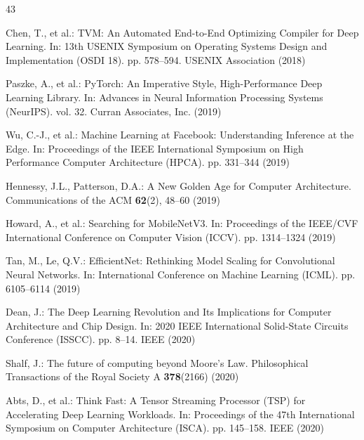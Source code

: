 \documentclass[conference]{IEEEtran}
\begin{document}
\begin{thebibliography}{43}

Chen, T., et al.: TVM: An Automated End-to-End Optimizing Compiler for Deep Learning. In: 13th USENIX Symposium on Operating Systems Design and Implementation (OSDI 18). pp. 578--594. USENIX Association (2018)


Paszke, A., et al.: PyTorch: An Imperative Style, High-Performance Deep Learning Library. In: Advances in Neural Information Processing Systems (NeurIPS). vol. 32. Curran Associates, Inc. (2019)


Wu, C.-J., et al.: Machine Learning at Facebook: Understanding Inference at the Edge. In: Proceedings of the IEEE International Symposium on High Performance Computer Architecture (HPCA). pp. 331--344 (2019)


Hennessy, J.L., Patterson, D.A.: A New Golden Age for Computer Architecture. Communications of the ACM \textbf{62}(2), 48--60 (2019)


Howard, A., et al.: Searching for MobileNetV3. In: Proceedings of the IEEE/CVF International Conference on Computer Vision (ICCV). pp. 1314--1324 (2019)


Tan, M., Le, Q.V.: EfficientNet: Rethinking Model Scaling for Convolutional Neural Networks. In: International Conference on Machine Learning (ICML). pp. 6105--6114 (2019)


Dean, J.: The Deep Learning Revolution and Its Implications for Computer Architecture and Chip Design. In: 2020 IEEE International Solid-State Circuits Conference (ISSCC). pp. 8--14. IEEE (2020)


Shalf, J.: The future of computing beyond Moore's Law. Philosophical Transactions of the Royal Society A \textbf{378}(2166) (2020)


Abts, D., et al.: Think Fast: A Tensor Streaming Processor (TSP) for Accelerating Deep Learning Workloads. In: Proceedings of the 47th International Symposium on Computer Architecture (ISCA). pp. 145--158. IEEE (2020)


\end{thebibliography}
\end{document}
